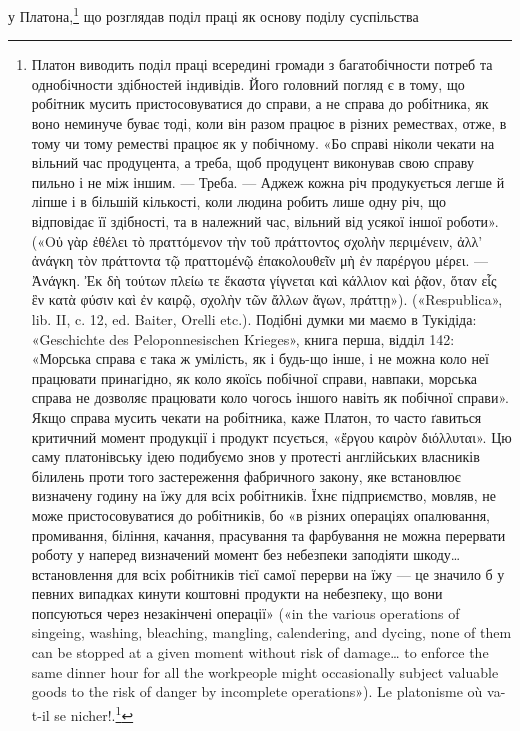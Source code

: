 у Платона,\footnote{
Платон виводить поділ праці всередині громади з багатобічности
потреб та однобічности здібностей індивідів. Його головний погляд є в
тому, що робітник мусить пристосовуватися до справи, а не справа до
робітника, як воно неминуче буває тоді, коли він разом працює в різних
ремествах, отже, в тому чи тому реместві працює як у побічному. «Бо
справі ніколи чекати на вільний час продуцента, а треба, щоб продуцент
виконував свою справу пильно і не між іншим. — Треба. — Аджеж кожна
річ продукується легше й ліпше і в більшій кількості, коли людина робить
лише одну річ, що відповідає її здібності, та в належний час, вільний
від усякої іншої роботи». («\textgreek{Οὐ γὰρ ἐθέλει τὸ πραττόμενον τὴν τοῦ πράττοντος σχολὴν περιμένειν, ἀλλ’
ἀνάγκη τὸν πράττοντα τῷ πραττομένῷ ἐπακολουθεῖν μὴ ἐν παρέργου μέρει. — Ἀνάγκη. Ἐκ δὴ τούτων πλείω
τε ἕκαστα γίγνεται καὶ κάλλιον καὶ ῥᾷον, ὅταν εἷς ἓν κατὰ φύσιν καὶ ἐν καιρῷ, σχολὴν τῶν ἄλλων ἄγων,
πράττῃ»}). («Respublica», lib. II, c. 12,
ed. Baiter, Orelli etc.). Подібні думки ми маємо в Тукідіда: «Geschichte
des Peloponnesischen Krieges», книга перша, відділ 142: «Морська справа
є така ж умілість, як і будь-що інше, і не можна коло неї працювати принагідно,
як коло якоїсь побічної справи, навпаки, морська справа не
дозволяє працювати коло чогось іншого навіть як побічної справи».
Якщо справа мусить чекати на робітника, каже Платон, то часто ґавиться
критичний момент продукції і продукт псується, «\textgreek{ἔργου καιρὸν διόλλυται}». Цю
саму платонівську ідею подибуємо знов у протесті англійських власників
білилень проти того застереження фабричного закону, яке встановлює визначену
годину на їжу для всіх робітників. Їхнє підприємство, мовляв, не
може пристосовуватися до робітників, бо «в різних операціях опалювання,
промивання, біління, качання, прасування та фарбування не можна
перервати роботу у наперед визначений момент без небезпеки заподіяти
шкоду\dots{} встановлення для всіх робітників тієї самої перерви на їжу —
це значило б у певних випадках кинути коштовні продукти на небезпеку,
що вони попсуються через незакінчені операції» («in the various operations
of singeing, washing, bleaching, mangling, calendering, and dycing,
none of them can be stopped at a given moment without risk of damage\dots{}
to enforce the same dinner hour for all the workpeople might occasionally
subject valuable goods to the risk of danger by incomplete operations»).
Le platonisme où va-t-il se nicher!.\footnote*{
Куди ще може продертись платонізм! \emph{Ред.}
}
} що розглядав поділ праці як основу поділу суспільства
